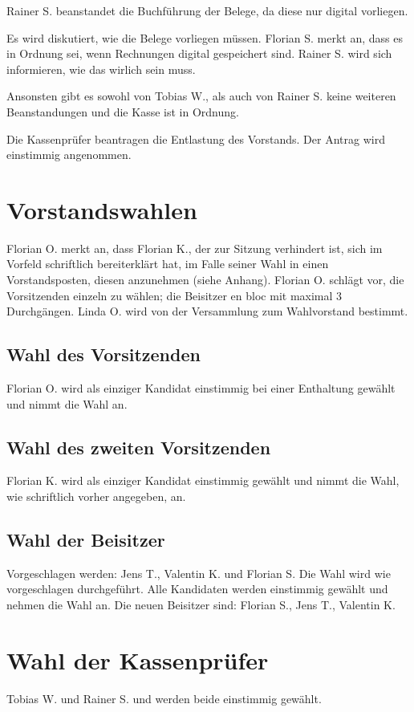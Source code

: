 Rainer S. beanstandet die Buchführung der Belege, da diese nur digital vorliegen.

Es wird diskutiert, wie die Belege vorliegen müssen. Florian S. merkt an, dass es in Ordnung sei, wenn Rechnungen digital gespeichert sind. Rainer S. wird sich informieren, wie das wirlich sein muss.

Ansonsten gibt es sowohl von Tobias W., als auch von Rainer S. keine weiteren Beanstandungen und die Kasse ist in Ordnung.

Die Kassenprüfer beantragen die Entlastung  des Vorstands.
Der Antrag wird einstimmig angenommen.

\section{Vorstandswahlen}
 Florian O. merkt an, dass Florian K., der zur Sitzung verhindert ist, sich im Vorfeld schriftlich bereiterklärt hat, im Falle seiner Wahl in einen Vorstandsposten, diesen anzunehmen (siehe Anhang).
 Florian O. schlägt vor, die Vorsitzenden einzeln zu wählen; die Beisitzer en bloc mit maximal 3 Durchgängen.
 Linda O. wird von der Versammlung zum Wahlvorstand bestimmt.
\subsection{Wahl des Vorsitzenden}
 Florian O. wird als einziger Kandidat einstimmig bei einer Enthaltung gewählt und nimmt die Wahl an. 
\subsection{Wahl des zweiten Vorsitzenden}         
 Florian K. wird als einziger Kandidat einstimmig gewählt und nimmt die Wahl, wie schriftlich vorher angegeben, an. 
\subsection{Wahl der Beisitzer}
  Vorgeschlagen werden: Jens T., Valentin K. und Florian S.
  Die Wahl wird wie vorgeschlagen durchgeführt. 
  Alle Kandidaten werden einstimmig gewählt und nehmen die Wahl an. 
  Die neuen Beisitzer sind: Florian S., Jens T., Valentin K.

\section{Wahl der Kassenprüfer}
 Tobias W. und Rainer S. und werden beide einstimmig gewählt. 
 
